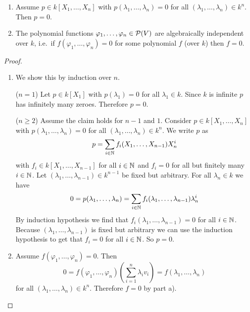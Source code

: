 \begin{lem}
  \begin{enumerate}[label=\emph{\alph*)},leftmargin=*]
    \item
      Assume $p \in k[X_1, \dotsc, X_n]$ with $p(\lambda_1, \dotsc, \lambda_n) = 0$ for all $(\lambda_1,\dotsc,\lambda_n) \in k^n$.
      Then $p = 0$.
    \item
      The polynomial functions $\varphi_1, \dotsc, \varphi_n \in \mathcal{P}(V)$ are algebraically independent over $k$, i.e.\ if $f(\varphi_1, \dotsc, \varphi_n) = 0$ for some polynomial $f$ (over $k$) then $f = 0$.
  \end{enumerate}
\end{lem}
\begin{proof}
  \begin{enumerate}[label=\emph{\alph*)},leftmargin=*]
    \item
      We show this by induction over $n$.
      
      ($n = 1$)
      Let $p \in k[X_1]$ with $p(\lambda_1) = 0$ for all $\lambda_1 \in k$.
      Since $k$ is infinite $p$ has infinitely many zeroes.
      Therefore $p = 0$.
      
      ($n \geq 2$)
      Assume the claim holds for $n-1$ and $1$.
      Consider $p \in k[X_1, \dotsc, X_n]$ with $p(\lambda_1, \dotsc, \lambda_n) = 0$ for all $(\lambda_1, \dotsc, \lambda_n) \in k^n$.
      We write $p$ as
      \[
          p
        = \sum_{i \in \mathbb{N}} f_i(X_1, \dotsc, X_{n-1}) X_n^i
      \]
      with $f_i \in k[X_1, \dotsc, X_{n-1}]$ for all $i \in \mathbb{N}$ and $f_i = 0$ for all but finitely many $i \in \mathbb{N}$.
      Let $(\lambda_1, \dotsc, \lambda_{n-1}) \in k^{n-1}$ be fixed but arbitrary.
      For all $\lambda_n \in k$ we have
      \[
          0
        = p(\lambda_1, \dotsc, \lambda_n)
        = \sum_{i \in \mathbb{N}} f_i(\lambda_1, \dotsc, \lambda_{n-1}) \lambda_n^i
      \]
      By induction hypothesis we find that $f_i(\lambda_1, \dotsc, \lambda_{n-1}) = 0$ for all $i \in \mathbb{N}$.
      Because $(\lambda_1, \dotsc, \lambda_{n-1})$ is fixed but arbitrary we can use the induction hypothesis to get that $f_i = 0$ for all $i \in \mathbb{N}$.
      So $p = 0$.
    \item
      Assume $f(\varphi_1, \dotsc, \varphi_n) = 0$. Then
      \[
          0
        = f(\varphi_1, \dotsc, \varphi_n)\left(\sum_{i=1}^n \lambda_i v_i\right)
        = f(\lambda_1, \dotsc, \lambda_n)
      \]
      for all $(\lambda_1, \dotsc, \lambda_n) \in k^n$.
      Therefore $f = 0$ by part a).
    \qedhere
  \end{enumerate}
\end{proof}

